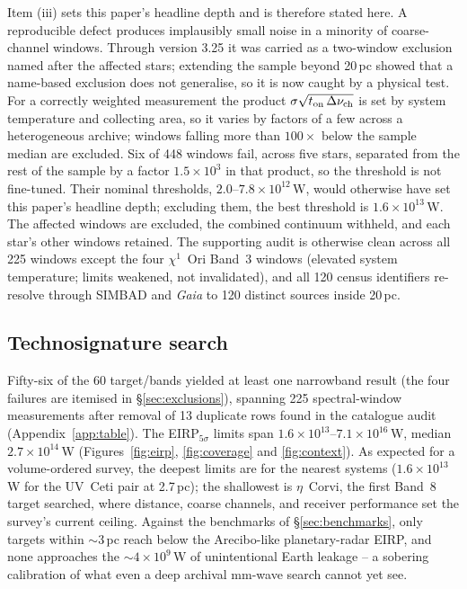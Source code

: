 \documentclass{openjournal}
\begin{document}
Item (iii) sets this paper's headline depth and is therefore stated
here. A reproducible defect produces implausibly small noise in a
minority of coarse-channel windows. Through version 3.25 it was
carried as a two-window exclusion named after the affected stars;
extending the sample beyond 20\,pc showed that a name-based exclusion
does not generalise, so it is now caught by a physical test. For a
correctly weighted measurement the product
$\sigma\sqrt{t_{\rm on}\,\Delta\nu_{\rm ch}}$ is set by system
temperature and collecting area, so it varies by factors of a few
across a heterogeneous archive; windows falling more than $100\times$
below the sample median are excluded. Six of 448 windows fail, across
five stars, separated from the rest of the sample by a factor
$1.5\times10^{3}$ in that product, so the threshold is not
fine-tuned. Their nominal thresholds, $2.0$--$7.8\times10^{12}$\,W,
would otherwise have set this paper's headline depth; excluding them,
the best threshold is $1.6\times10^{13}$\,W. The affected windows are
excluded, the combined continuum withheld, and each star's other
windows retained. The supporting audit is otherwise clean across all
225 windows except the four $\chi^{1}$~Ori Band~3 windows (elevated
system temperature; limits weakened, not invalidated), and all 120
census identifiers re-resolve through SIMBAD and \emph{Gaia} to 120
distinct sources inside 20\,pc.

\subsection{Technosignature search}
\label{sec:technosearch}

Fifty-six of the 60 target/bands yielded at least one narrowband
result (the four failures are itemised in \S\ref{sec:exclusions}),
spanning 225 spectral-window measurements after removal of 13
duplicate rows found in the catalogue audit
(Appendix~\ref{app:table}). The EIRP$_{5\sigma}$ limits span
$1.6\times10^{13}$--$7.1\times10^{16}$\,W, median
$2.7\times10^{14}$\,W (Figures~\ref{fig:eirp}, \ref{fig:coverage} and
\ref{fig:context}). As expected for a volume-ordered survey, the
deepest limits are for the nearest systems ($1.6\times10^{13}$\,W for
the UV~Ceti pair at 2.7\,pc); the shallowest is $\eta$~Corvi, the
first Band~8 target searched, where distance, coarse channels, and
receiver performance set the survey's current ceiling. Against the
benchmarks of \S\ref{sec:benchmarks}, only targets within
$\sim$3\,pc reach below the Arecibo-like planetary-radar EIRP, and
none approaches the $\sim4\times10^{9}$\,W of unintentional Earth
leakage -- a sobering calibration of what even a deep archival
mm-wave search cannot yet see.
\end{document}
